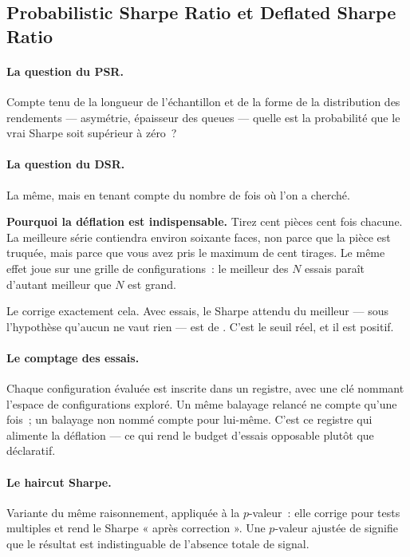 \subsection{Probabilistic Sharpe Ratio et Deflated Sharpe Ratio}

\paragraph{La question du PSR.} Compte tenu de la longueur de l'échantillon
et de la forme de la distribution des rendements --- asymétrie, épaisseur des
queues --- quelle est la probabilité que le vrai Sharpe soit supérieur à
zéro~?

\paragraph{La question du DSR.} La même, mais en tenant compte du nombre de
fois où l'on a cherché.

\begin{examplebox}
\textbf{Pourquoi la déflation est indispensable.} Tirez cent pièces cent fois
chacune. La meilleure série contiendra environ soixante faces, non parce que
la pièce est truquée, mais parce que vous avez pris le maximum de cent
tirages. Le même effet joue sur une grille de configurations~: le meilleur des
$N$ essais paraît d'autant meilleur que $N$ est grand.

Le  corrige exactement cela. Avec \XTenTrialsCount{} essais, le
Sharpe attendu du meilleur --- sous l'hypothèse qu'aucun ne vaut rien --- est
de \metric{\XTenExpectedMaxSharpe}. C'est le seuil réel, et il est positif.
\end{examplebox}

\paragraph{Le comptage des essais.} Chaque configuration évaluée est inscrite
dans un registre, avec une clé nommant l'espace de configurations exploré. Un
même balayage relancé ne compte qu'une fois~; un balayage non nommé compte
pour lui-même. C'est ce registre qui alimente la déflation --- ce qui rend le
budget d'essais opposable plutôt que déclaratif.

\paragraph{Le haircut Sharpe.} Variante du même raisonnement, appliquée à la
$p$-valeur~: elle corrige pour tests multiples et rend le Sharpe « après
correction ». Une $p$-valeur ajustée de \XTenHaircutPValue{} signifie que le
résultat est indistinguable de l'absence totale de signal.

